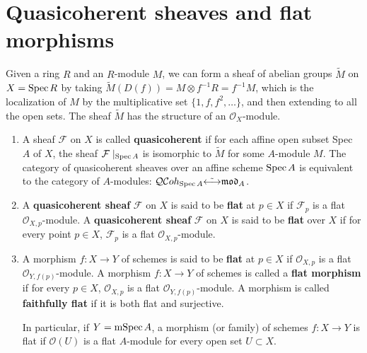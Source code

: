 \documentclass[12pt]{article}
\theoremstyle{mytheoremstyle}
\newcommand{\cO}{\mathcal{O}}
\newcommand{\cF}{\mathcal{F}}
\newcommand{\spec}{\text{Spec\hspace*{.5mm}}}
\newcommand{\mspec}{\text{mSpec\hspace*{.5mm}}}
\begin{document}
\section{Quasicoherent sheaves and flat morphisms}
\hspace*{8mm}Given a ring $R$ and an 
$R$-module $M$, we can form a sheaf of abelian
groups $\widetilde{M}$ on $X= \spec R$ by taking $\widetilde{M}(D(f))
= M\otimes f^{-1}R = f^{-1}M$, which is the localization of $M$ by the
multiplicative set $\{1,f,f^2,\ldots\}$, and then extending to
all the open sets. The sheaf $\widetilde{M}$
has the structure of an $\cO_X$-module.

\begin{enumerate}

    \item A sheaf $\cF$ on $X$ is called \textbf{quasicoherent} if for each affine
        open subset Spec $A$ of $X$, the sheaf $\cF\mid_{\spec A}$
        is isomorphic to $\widetilde{M}$ for some $A$-module $M$.
        The category of quasicoherent sheaves over an affine
        scheme $\spec A$ is equivalent to the category of $A$-modules:
        $\mathcal{QC}oh_{\spec A} \tilde{\longleftrightarrow}
        \mathfrak{mod}_A$.
    
    \item A \textbf{quasicoherent sheaf} $\cF$ on $X$ is said to be
        \textbf{flat} at $p\in X$
        if $\cF_p$ is a flat $\cO_{X,p}$-module.
        A \textbf{quasicoherent sheaf} $\cF$ on $X$ is said to be
        \textbf{flat} over $X$
        if for every point $p\in X$, $\cF_p$ is a flat
        $\cO_{X,p}$-module.

    \item A morphism $f:X\to Y$ of schemes is said to be \textbf{flat}
        at $p\in X$ if $\cO_{X,p}$ is a flat
        $\cO_{Y,f(p)}$-module.
        A morphism $f:X\to Y$ of schemes is called a \textbf{flat
        morphism} if for every $p\in X$, $\cO_{X,p}$ is a flat
        $\cO_{Y,f(p)}$-module.
        A morphism is called \textbf{faithfully flat} if it is both
        flat and surjective.

        In particular, if $Y=\mspec A$, a morphism (or family)
        of schemes
        $f:X\to Y$ is flat if $\cO(U)$ is a flat $A$-module for every
        open set $U\subset X$.

\end{enumerate}
\end{document}
